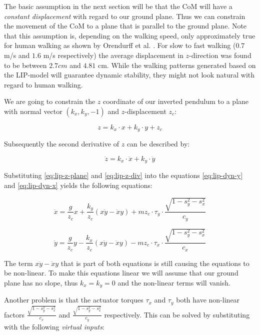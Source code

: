 \documentclass[english,ngerman]{KITreprt}
\begin{document}
The basic assumption in the next section will be that the CoM will have
a \emph{constant displacement} with regard to our ground plane. Thus we
can constrain the movement of the CoM to a plane that is parallel to the
ground plane. Note that this assumption is, depending on the walking
speed, only approximately true for human walking as shown by Orendurff
et al. \citep{orendurff2004effect}. For slow to fast walking ($0.7$ m/s
and $1.6$ m/s respectively) the average displacement in $z$-direction
was found to be between $2.7cm$ and $4.81$ cm. While the walking
patterns generated based on the LIP-model will guarantee dynamic
stability, they might not look natural with regard to human walking.

We are going to constrain the $z$ coordinate of our inverted pendulum to
a plane with normal vector $(k_x, k_y, -1)$ and $z$-displacement $z_c$:

\begin{equation} \label{eq:lip-z-plane}
z = k_x \cdot x + k_y \cdot y + z_c
\end{equation}

Subsequently the second derivative of $z$ can be described by:

\begin{equation} \label{eq:lip-z-div}
\ddot{z} = k_x \cdot \ddot{x} + k_y \cdot \ddot{y}
\end{equation}

Substituting \ref{eq:lip-z-plane} and \ref{eq:lip-z-div} into the
equations \ref{eq:lip-dyn-y} and \ref{eq:lip-dyn-x} yields the following
equations:

\begin{equation}
\ddot{x} = \frac{g}{z_c} x + \frac{k_y}{z_c} (x\ddot{y} - \ddot{x}y) + m z_c \cdot \tau_y \cdot \frac{\sqrt{1 - s_y^2 - s_x^2}}{c_y}
\end{equation}

\begin{equation}
\ddot{y} = \frac{g}{z_c} y - \frac{k_x}{z_c} (x\ddot{y} - \ddot{x}y) - m z_c \cdot \tau_x \cdot \frac{\sqrt{1 - s_y^2 - s_x^2}}{c_x}
\end{equation}

The term $x\ddot{y} - \ddot{x}y$ that is part of both equations is still
causing the equations to be non-linear. To make this equations linear we
will assume that our ground plane has no slope, thus $k_x = k_y = 0$ and
the non-linear terms will vanish.

Another problem is that the actuator torques $\tau_x$ and $\tau_y$ both
have non-linear factors $\frac{\sqrt{1 - s_y^2 - s_x^2}}{c_x}$ and
$\frac{\sqrt{1 - s_y^2 - s_x^2}}{c_y}$ respectively. This can be solved
by substituting with the following \emph{virtual inputs}:
\end{document}
